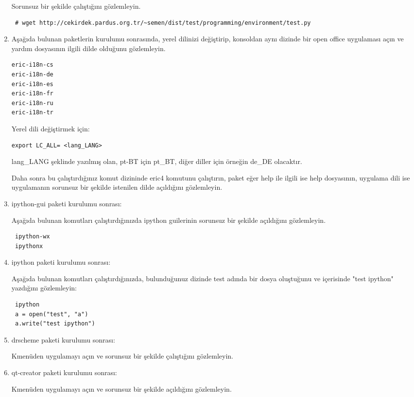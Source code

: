 \documentclass[a4paper,10pt]{article}
\begin{document}
\begin{enumerate}
Sorunsuz bir şekilde çalıştığını gözlemleyin.
\begin{verbatim}
 # wget http://cekirdek.pardus.org.tr/~semen/dist/test/programming/environment/test.py
\end{verbatim}
 \item Aşağıda bulunan paketlerin kurulumu sonrasında, yerel dilinizi değiştirip, konsoldan aynı dizinde bir open office uygulaması açın ve yardım dosyasının ilgili dilde olduğunu gözlemleyin.
\begin{verbatim}
eric-i18n-cs
eric-i18n-de
eric-i18n-es
eric-i18n-fr
eric-i18n-ru
eric-i18n-tr
 \end{verbatim}

Yerel dili değiştirmek için:
\begin{verbatim}
export LC_ALL= <lang_LANG>
\end{verbatim}

lang\_LANG şeklinde yazılmış olan, pt-BT için pt\_BT, diğer diller için örneğin de\_DE olacaktır.

Daha sonra bu çalıştırdığınız komut dizininde eric4 komutunu çalıştırın, paket eğer help ile ilgili ise help dosyasının, uygulama dili ise uygulamanın sorunsuz bir şekilde istenilen dilde açıldığını gözlemleyin.

\item ipython-gui paketi kurulumu sonrası:

Aşağıda bulunan komutları çalıştırdığınızda ipython guilerinin sorunsuz bir şekilde açıldığını gözlemleyin.
\begin{verbatim}
 ipython-wx
 ipythonx
\end{verbatim}


\item ipython paketi kurulumu sonrası: 

Aşağıda bulunan komutları çalıştırdığınızda, bulunduğunuz dizinde test adında bir dosya oluştuğunu ve içerisinde "test ipython" yazdığını gözlemleyin:
\begin{verbatim}
 ipython
 a = open("test", "a")
 a.write("test ipython")
\end{verbatim}

\item drscheme paketi kurulumu sonrası:

Kmenüden uygulamayı açın ve sorunsuz bir şekilde çalıştığını gözlemleyin.

\item qt-creator paketi kurulumu sonrası:

Kmenüden uygulamayı açın ve sorunsuz bir şekilde açıldığını gözlemleyin.
\end{enumerate}
\end{document}
